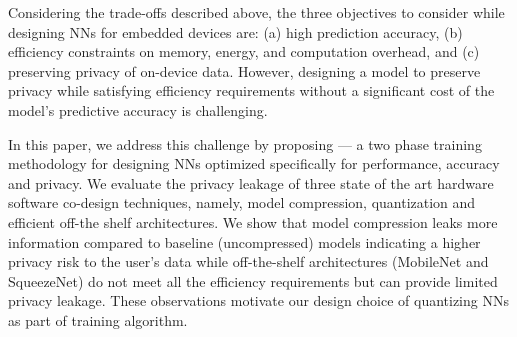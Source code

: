 Considering the trade-offs described above, the three objectives to consider while designing NNs for embedded devices are: (a) high prediction accuracy, (b) efficiency constraints on memory, energy, and computation overhead, and (c) preserving privacy of on-device data.
However, designing a model to preserve privacy while satisfying efficiency requirements without a significant cost of the model’s predictive accuracy is challenging.

In this paper, we address this challenge by proposing \method\hspace{0.02in} — a two phase training methodology for designing NNs optimized specifically for performance, accuracy and privacy. We evaluate the privacy leakage of three state of the art hardware software co-design techniques, namely, model compression, quantization and efficient off-the shelf architectures. We show that model compression leaks more information compared to baseline (uncompressed) models indicating a higher privacy risk to the user’s data while off-the-shelf architectures (MobileNet and SqueezeNet) do not meet all the efficiency requirements but can provide limited privacy leakage. These observations motivate our design choice of quantizing NNs as part of \method\hspace{0.02in} training algorithm.


